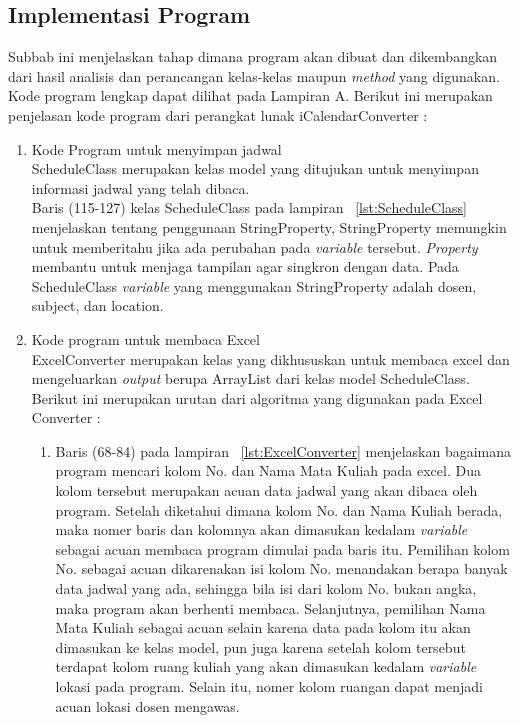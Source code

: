 \subsection{Implementasi Program}
Subbab ini menjelaskan tahap dimana program akan dibuat dan dikembangkan dari hasil analisis dan perancangan kelas-kelas maupun \textit{method} yang digunakan. Kode program lengkap dapat dilihat pada Lampiran A. 
Berikut ini merupakan penjelasan kode program dari perangkat lunak iCalendarConverter :
\begin{enumerate}
	\item Kode Program untuk menyimpan jadwal \\
	ScheduleClass merupakan kelas model yang ditujukan untuk menyimpan informasi jadwal yang telah dibaca.\\
	Baris (115-127) kelas ScheduleClass pada lampiran ~\ref{lst:ScheduleClass} menjelaskan tentang penggunaan StringProperty, 
	StringProperty memungkin untuk memberitahu jika ada perubahan pada \textit{variable} tersebut. \textit{Property} membantu untuk menjaga tampilan agar singkron dengan data. Pada ScheduleClass \textit{variable} yang menggunakan StringProperty adalah dosen, subject, dan location.	
	\item Kode program untuk membaca Excel \\
	ExcelConverter merupakan kelas yang dikhususkan untuk membaca excel dan mengeluarkan \textit{output} berupa ArrayList dari kelas model ScheduleClass.\\
	Berikut ini merupakan urutan dari algoritma yang digunakan pada Excel Converter :
\begin{enumerate}
		\item Baris (68-84) pada lampiran ~\ref{lst:ExcelConverter} menjelaskan bagaimana program mencari kolom No. dan Nama Mata Kuliah pada excel. Dua kolom tersebut merupakan acuan data jadwal yang akan dibaca oleh program. Setelah diketahui dimana kolom No. dan Nama Kuliah berada, maka nomer baris dan kolomnya akan dimasukan kedalam \textit{variable} sebagai acuan membaca program dimulai pada baris itu. Pemilihan kolom No. sebagai acuan dikarenakan isi kolom No. menandakan berapa banyak data jadwal yang ada, sehingga bila isi dari kolom No. bukan angka, maka program akan berhenti membaca. Selanjutnya, pemilihan Nama Mata Kuliah sebagai acuan selain karena data pada kolom itu akan dimasukan ke kelas model, pun juga karena setelah kolom tersebut terdapat kolom ruang kuliah yang akan dimasukan kedalam \textit{variable} lokasi pada program.
		Selain itu, nomer kolom ruangan dapat menjadi acuan lokasi dosen mengawas.

\end{enumerate}
\end{enumerate}
